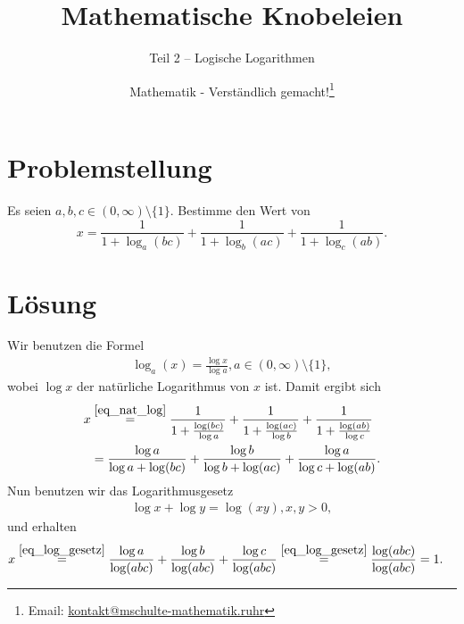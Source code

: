 \documentclass[]{scrartcl}
\title{Mathematische Knobeleien}
\subtitle{Teil 2 -- Logische Logarithmen}
\author{Mathematik - Verständlich gemacht!\footnote{Email: \href{mailto:kontakt@mschulte-mathematik.ruhr}{kontakt@mschulte-mathematik.ruhr}}}
\begin{document}
\maketitle

\section*{Problemstellung}
Es seien $a,b,c \in (0,\infty) \setminus \{1\}$. Bestimme den Wert von
$$
x = \frac{1}{1+\log_a(bc)} + \frac{1}{1+\log_b(ac)} + \frac{1}{1+\log_c(ab)}.
$$

\section*{Lösung}
Wir benutzen die Formel 
\begin{align*}
	\log_a(x) = \frac{\log x}{\log a}, a \in (0,\infty) \setminus \{1\},
	\tag{$\ast$}
	\label{eq_nat_log}
\end{align*}
wobei $\log x$ der natürliche Logarithmus von $x$ ist.
Damit ergibt sich 
\begin{align*}
	x 
	& \overset{\eqref{eq_nat_log}}{=}
	\frac{1}{1+\frac{\log(bc)}{\log a}} +
	\frac{1}{1+\frac{\log(ac)}{\log b}} +
	\frac{1}{1+\frac{\log(ab)}{\log c}}
	\\ &= 
	\frac{\log a}{\log a + \log(bc)} +
	\frac{\log b}{\log b + \log(ac)} +
	\frac{\log a}{\log c + \log(ab)}.
\end{align*}
Nun benutzen wir das Logarithmusgesetz
\begin{align*}
	\log x + \log y = \log(xy)
	\tag{$\ast\ast$}, x,y > 0,
	\label{eq_log_gesetz}
\end{align*}
und erhalten
\begin{align*}
	x 
	& \overset{\eqref{eq_log_gesetz}}{=}
	\frac{\log a}{\log(abc)} +
	\frac{\log b}{\log(abc)} +
	\frac{\log c}{\log(abc)} 
	\overset{\eqref{eq_log_gesetz}}{=}
	\frac{\log(abc)}{\log(abc)} = 1.
\end{align*}
\end{document}
